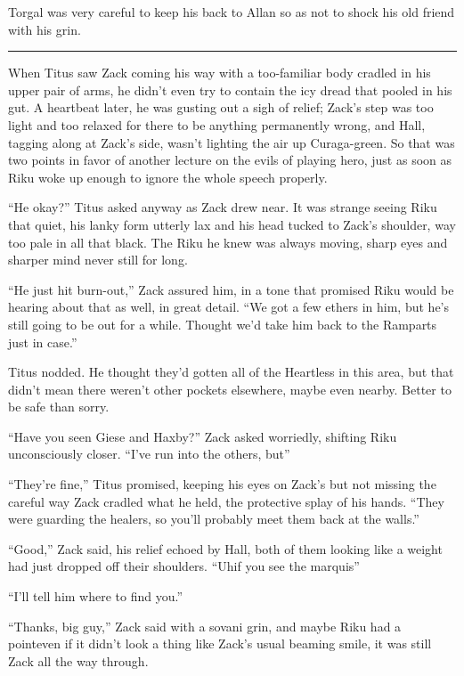 Torgal was very careful to keep his back to Allan so as not to shock his old friend with his grin.

\fancybreak{\pfbreakdisplay}


When Titus saw Zack coming his way with a too-familiar body cradled in his upper pair of arms, he didn't even try to contain the icy dread that pooled in his gut. A heartbeat later, he was gusting out a sigh of relief; Zack's step was too light and too relaxed for there to be anything permanently wrong, and Hall, tagging along at Zack's side, wasn't lighting the air up Curaga-green. So that was two points in favor of another lecture on the evils of playing hero, just as soon as Riku woke up enough to ignore the whole speech properly.

``He okay?'' Titus asked anyway as Zack drew near. It was strange seeing Riku that quiet, his lanky form utterly lax and his head tucked to Zack's shoulder, way too pale in all that black. The Riku he knew was always moving, sharp eyes and sharper mind never still for long.

``He just hit burn-out,'' Zack assured him, in a tone that promised Riku would be hearing about that as well, in great detail. ``We got a few ethers in him, but he's still going to be out for a while. Thought we'd take him back to the Ramparts just in case.''

Titus nodded. He thought they'd gotten all of the Heartless in this area, but that didn't mean there weren't other pockets elsewhere, maybe even nearby. Better to be safe than sorry.

``Have you seen Giese and Haxby?'' Zack asked worriedly, shifting Riku unconsciously closer. ``I've run into the others, but\textemdash ''

``They're fine,'' Titus promised, keeping his eyes on Zack's but not missing the careful way Zack cradled what he held, the protective splay of his hands. ``They were guarding the healers, so you'll probably meet them back at the walls.''

``Good,'' Zack said, his relief echoed by Hall, both of them looking like a weight had just dropped off their shoulders. ``Uh\textemdash if you see the marquis\textemdash ''

``I'll tell him where to find you.''

``Thanks, big guy,'' Zack said with a sovani grin, and maybe Riku had a point\textemdash even if it didn't look a thing like Zack's usual beaming smile, it was still Zack all the way through.

